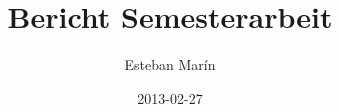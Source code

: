 \documentclass[12pt,a4paper]{article}
\begin{document}
\title{Bericht Semesterarbeit}
\author{Esteban Marín}
\date{2013-02-27}
\maketitle

\begin{abstract}



\end{abstract}

\newpage
\tableofcontents
\pagestyle{headings}

\newpage




\end{document}
